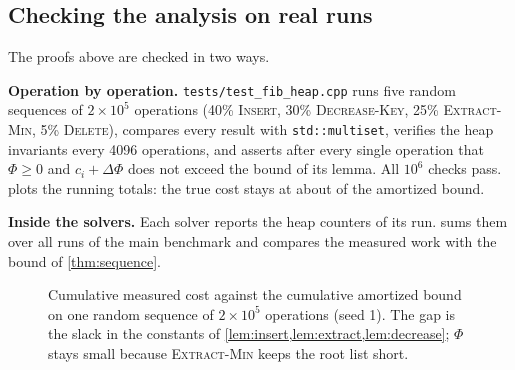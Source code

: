 \subsection{Checking the analysis on real runs}\label{sec:amortized-check}
The proofs above are checked in two ways.

\textbf{Operation by operation.} \texttt{tests/test\_fib\_heap.cpp} runs five random sequences of \(2\times10^5\)
operations (40\% \textsc{Insert}, 30\% \textsc{Decrease-Key}, 25\% \textsc{Extract-Min}, 5\% \textsc{Delete}), compares every result with
\texttt{std::multiset}, verifies the heap invariants every 4096 operations, and asserts after every single operation
that \(\Phi\ge0\) and \(c_i+\Delta\Phi\) does not exceed the bound of its lemma. All \(10^6\) checks pass.
 plots the running totals: the true cost stays at about  of the amortized bound.

\textbf{Inside the solvers.} Each solver reports the heap counters of its run.  sums them over
all runs of the main benchmark and compares the measured work with the bound of \cref{thm:sequence}.

\begin{figure}[!htbp]\centering
{}
\caption{Cumulative measured cost against the cumulative amortized bound on one random sequence of
\(2\times10^5\) operations (seed 1). The gap is the slack in the constants of \cref{lem:insert,lem:extract,lem:decrease};
\(\Phi\) stays small because \textsc{Extract-Min} keeps the root list short.}\label{fig:amort}
\end{figure}


